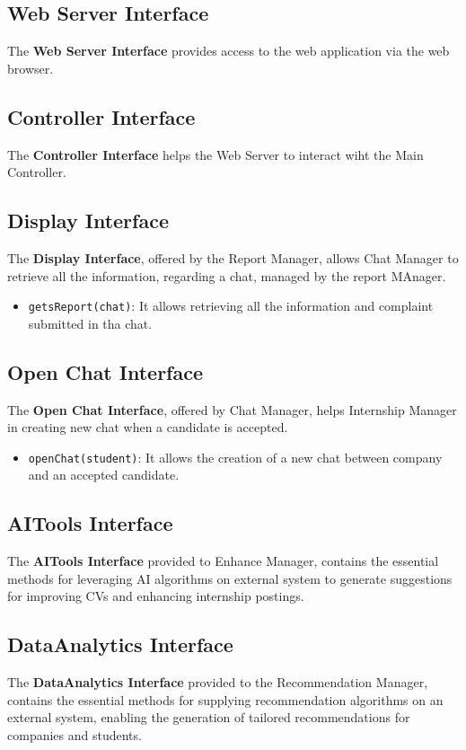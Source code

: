\subsection{Web Server Interface}
The \textbf{Web Server Interface} provides access to the web application via the web browser. 

\subsection{Controller Interface}
The \textbf{Controller Interface} helps the Web Server to interact wiht the Main Controller.
\subsection{Display Interface}
The \textbf{Display Interface}, offered by the Report Manager, allows Chat Manager to retrieve all the information, regarding a chat, managed by the report MAnager. 
\begin{itemize}
    \item \texttt{getsReport(chat)}: It allows retrieving all the information and complaint submitted in tha chat.
\end{itemize}

\subsection{Open Chat Interface}
The \textbf{Open Chat Interface}, offered by Chat Manager, helps Internship Manager in creating new chat when a candidate is accepted.
\begin{itemize}
    \item \texttt{openChat(student)}: It allows the creation of a new chat between company and an accepted candidate.
\end{itemize}

\subsection{AITools Interface}
The \textbf{AITools Interface} provided to Enhance Manager, contains the essential methods for leveraging AI algorithms on external system to generate suggestions for improving CVs and enhancing internship postings. 


\subsection{DataAnalytics Interface}
The \textbf{DataAnalytics Interface} provided to the Recommendation Manager, contains the essential methods for supplying recommendation algorithms on an external system, enabling the generation of tailored recommendations for companies and students. 

